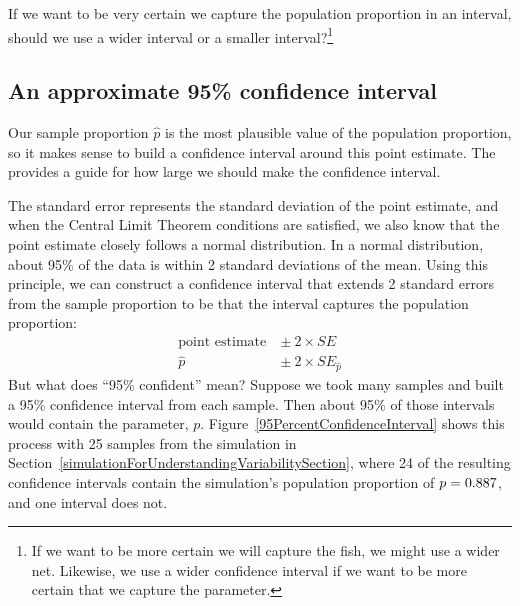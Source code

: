 \begin{exercise}
If we want to be very certain we capture the population
proportion in an interval, should we use a wider interval
or a smaller interval?\footnote{If we want to be more
certain we will capture the fish, we might use a
wider net. Likewise, we use a wider confidence interval
if we want to be more certain that we capture the
parameter.}
\end{exercise}

\subsection{An approximate 95\% confidence interval}

Our sample proportion $\hat{p}$ is the most plausible
value of the population proportion, so it makes sense
to build a confidence interval around this point estimate.
The  provides a guide for how
large we should make the confidence interval.

The standard error represents the standard deviation
of the point estimate, and when the Central
Limit Theorem conditions are satisfied, we also know
that the point estimate closely follows a normal
distribution. In a normal distribution, about 95\% of
the data is within 2 standard deviations of the mean.
Using this principle, we can construct a confidence
interval that extends 2 standard errors from the sample
proportion to be 
that the interval captures the population proportion:
\begin{align*}
\text{point estimate}\ &\pm\ 2\times SE \\
\hat{p}\ &\pm\ 2\times SE_{\hat{p}}
\end{align*}
But what does ``95\% confident'' mean? Suppose we took
many samples and built a 95\% confidence interval from
each sample. Then about 95\% of those intervals would
contain the parameter, $p$.
Figure~\ref{95PercentConfidenceInterval} shows this
process with 25 samples from the simulation in
Section~\ref{simulationForUnderstandingVariabilitySection},
where 24 of the resulting confidence intervals contain
the simulation's population proportion of
$p = 0.887{}$, and one interval does not.

